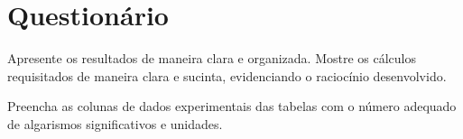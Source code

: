 \cleardoublepage


\vspace{15mm}

\begin{fullwidth}
\noindent{}
\vspace{5mm}

\noindent{}

\noindent{}

\noindent{}

\noindent{}

\noindent{}
\end{fullwidth}

\vspace{5mm}

\section{Questionário}

\begin{question}[type={exam}]{1}
Apresente os resultados de maneira clara e organizada. Mostre os cálculos requisitados de maneira clara e sucinta, evidenciando o raciocínio desenvolvido.
\end{question}

\begin{question}[type={exam}]{1}
Preencha as colunas de dados experimentais das tabelas com o número adequado de algarismos significativos e unidades.
\end{question}


